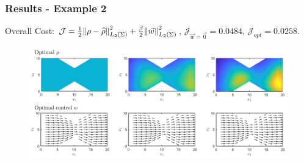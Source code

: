 \documentclass[aspectratio=169,xcolor=dvipsnames]{beamer}
\begin{document}
\begin{frame}
	\frametitle{Results - Example 2}
	\vspace{0.3cm}
	Overall Cost: $\mathcal J = \frac{1}{2}\norm{\rho- \widehat{\rho}}_{L_2(\Sigma)}^2 + \frac{\beta}{2} \norm{\vec{w}}_{L_2(\Sigma)}^2$, $\mathcal J_{\vec{w} = \vec 0} = 0.0484$, $\mathcal J_{opt} = 0.0258$.
	\begin{figure}
		\includegraphics[width=14cm]{ExRes2b2.png}
	\end{figure}
\end{frame}
\end{document}
